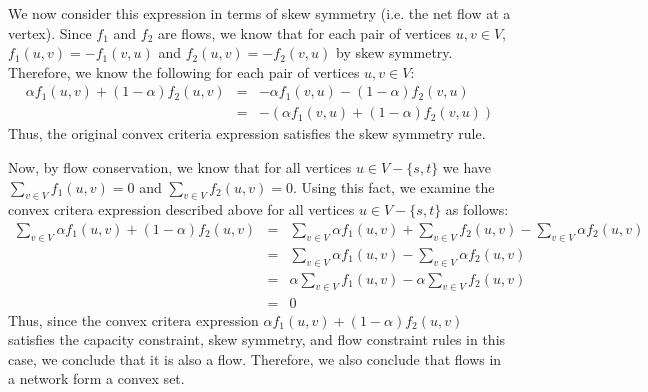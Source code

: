 \documentclass[11pt]{article}
\begin{document}
\begin{sol}
We now consider this expression in terms of skew symmetry (i.e. the net flow at a vertex). Since $f_1$ and $f_2$ are flows, we know that for each pair of vertices $u, v \in V$, $f_1(u,v) = -f_1(v,u)$ and $f_2(u,v) = -f_2(v,u)$ by skew symmetry. Therefore, we know the following for each pair of vertices $u, v \in V$:
\begin{eqnarray*}
\alpha f_1(u,v) + (1 - \alpha)f_2(u,v) & = & -\alpha f_1(v,u) - (1 - \alpha)f_2(v,u) \\
& = & -(\alpha f_1(v,u) + (1 - \alpha)f_2(v,u))
\end{eqnarray*}
Thus, the original convex criteria expression satisfies the skew symmetry rule.

Now, by flow conservation, we know that for all vertices $u \in V - \{s,t\}$ we have $\sum_{v \in V}f_1(u,v) = 0$ and  $\sum_{v \in V}f_2(u,v) = 0$. Using this fact, we examine the convex critera expression described above for all vertices $u \in V - \{s,t\}$ as follows:
\begin{eqnarray*}
\sum_{v \in V}\alpha f_1(u,v) + (1 - \alpha)f_2(u,v) & = & \sum_{v \in V}\alpha f_1(u,v) + \sum_{v \in V}f_2(u,v) - \sum_{v \in V}\alpha f_2(u,v) \\
& = & \sum_{v \in V}\alpha f_1(u,v) - \sum_{v \in V}\alpha f_2(u,v) \\
& = & \alpha\sum_{v \in V} f_1(u,v) - \alpha\sum_{v \in V} f_2(u,v) \\
& = & 0
\end{eqnarray*}
Thus, since the convex critera expression $\alpha f_1(u,v) + (1 - \alpha)f_2(u,v)$ satisfies the capacity constraint, skew symmetry, and flow constraint rules in this case, we conclude that it is also a flow. Therefore, we also conclude that flows in a network form a convex set.
\end{sol}
\end{document}
